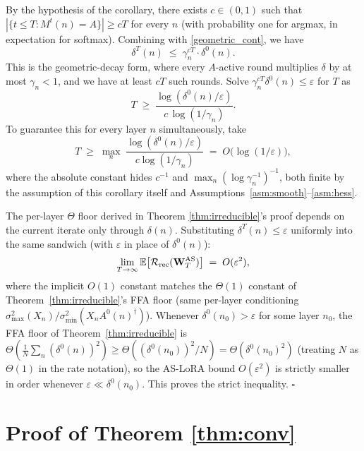 By the hypothesis of the corollary, there exists $c\in(0,1)$ such that $|\{t\le T:M^t(n)=A\}|\ge cT$ for every $n$ (with probability one for argmax, in expectation for softmax). Combining with \eqref{geometric_cont}, we have 
\begin{equation}
\delta^T(n) \;\le\; \gamma_n^{cT}\cdot\delta^0(n).
\end{equation}
This is the geometric-decay form, where every $A$-active round multiplies $\delta$ by at most $\gamma_n<1$, and we have at least $cT$ such rounds. Solve $\gamma_n^{cT}\delta^0(n)\le\varepsilon$ for $T$ as
\begin{equation}
T \;\ge\; \frac{\log(\delta^0(n)/\varepsilon)}{c\,\log(1/\gamma_n)}.
\end{equation}
To guarantee this for every layer $n$ simultaneously, take
\begin{equation}
T \;\ge\; \max_n\;\frac{\log(\delta^0(n)/\varepsilon)}{c\log(1/\gamma_n)} \;=\; O\!\bigl(\log(1/\varepsilon)\bigr),
\end{equation}
where the absolute constant hides $c^{-1}$ and $\max_n(\log\gamma_n^{-1})^{-1}$, both finite by the assumption of this corollary itself and Assumptions~\ref{asm:smooth}--\ref{asm:hess}.

The per-layer $\Theta$ floor derived in Theorem \ref{thm:irreducible}'s proof depends on the current iterate only through $\delta(n)$. Substituting $\delta^T(n)\le\varepsilon$ uniformly into the same sandwich (with $\varepsilon$ in place of $\delta^0(n)$):
\begin{equation}
\lim_{T\to\infty}\mathbb{E}\bigl[\mathcal R_\text{rec}(\mathbf W_T^{\text{AS}})\bigr] \;=\; O(\varepsilon^2),
\end{equation}
where the implicit $O(1)$ constant matches the $\Theta(1)$ constant of Theorem~\ref{thm:irreducible}'s FFA floor (same per-layer conditioning $\sigma_{\max}^2(X_n)/\sigma_{\min}^2(X_n A^0(n)^\dagger)$). Whenever $\delta^0(n_0)>\varepsilon$ for some layer $n_0$, the FFA floor of Theorem~\ref{thm:irreducible} is $\Theta(\frac{1}{N}\sum_n (\delta^0(n))^2) \ge \Theta((\delta^0(n_0))^2/N) = \Theta(\delta^0(n_0)^2)$ (treating $N$ as $\Theta(1)$ in the rate notation), so the AS-LoRA bound $O(\varepsilon^2)$ is strictly smaller in order whenever $\varepsilon \ll \delta^0(n_0)$. This proves the strict inequality. \hfill$\square$







\section{Proof of Theorem \ref{thm:conv}} 
\label{app:proof-conv}

